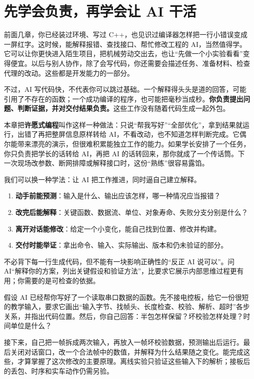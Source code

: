\section{先学会负责，再学会让 AI 干活}
\label{sec:ai-responsibility}

前面几章，你已经装过环境、写过 C++，也见识过编译器怎样把一行小错误变成一屏红字。这时候，能解释报错、查找接口、帮忙修改工程的 AI，当然值得学。它可以让你更快进入陌生项目，把机械劳动交出去，也让“先做一个小实验看看”变得便宜。以后与别人协作，除了会写代码，你还需要会描述任务、准备材料、检查代理的改动。这些都是开发能力的一部分。

不过，AI 写代码快，不代表你可以跳过基础。一个解释得头头是道的回答，可能引用了不存在的函数；一个成功编译的程序，也可能把毫秒当成秒。\textbf{你负责提出问题、判断证据，并对交付结果负责。}这些工作没有随着代码生成一起外包。

本章把\textbf{许愿式编程}叫作这样一种做法：只说“帮我写好”“全部优化”，拿到结果就运行，出错了再把整屏信息原样转给 AI，不看改动，也不知道怎样判断完成。它偶尔能带来漂亮的演示，但很难积累能独立工作的能力。如果学长安排了一个任务，你只负责把学长的话转给 AI，再把 AI 的话转回来，那你就成了一个传话筒。下一次现场改参数、断网排障或解释接口时，这份“熟练”很容易露馅。

我们可以换一种学法：让 AI 把工作推进，同时逼自己建立解释。
\begin{enumerate}
    \item \textbf{动手前能预测}：输入是什么、输出应该怎样，哪一种情况应当报错？
    \item \textbf{改完后能解释}：关键函数、数据流、单位、对象寿命、失败分支分别是什么？
    \item \textbf{离开对话能修改}：给定一个小变化，能自己找到位置、修改并构建。
    \item \textbf{交付时能举证}：拿出命令、输入、实际输出、版本和仍未验证的部分。
\end{enumerate}
不必背下每一行生成代码，但不能有一块影响正确性的“反正 AI 说可以”。问 AI“解释你的方案，列出关键假设和验证方法”，比要求它展示内部思维过程更有用；你需要的是可检查的依据。

\begin{example}
假设 AI 已经帮你写好了一个读取串口数据的函数。先不接电控板，给它一份很短的教学输入，要求它画出“输入字节、找帧头、长度检查、校验、解析、超时”各步关系，并指出代码位置。然后，你自己回答：半包怎样保留？坏校验怎样处理？时间单位是什么？

接下来，自己把一帧拆成两次输入，再放入一帧坏校验数据，预测输出后运行。最后关闭对话窗口，改一个合法帧中的数值，并解释为什么结果随之变化。能完成这些，才算掌握了这次修改的主要原理。离线实验只验证这些输入下的解析；接板后的丢包、时序和实车动作仍需另验。
\end{example}

